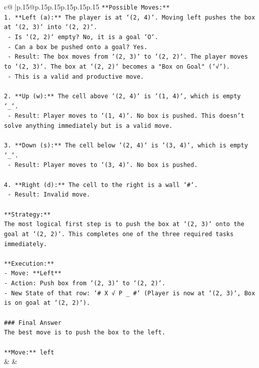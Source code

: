 \documentclass{article}
\begin{document}
{\begin{supertabular}{c@{$\;$}|p{.15\linewidth}@{}p{.15\linewidth}p{.15\linewidth}p{.15\linewidth}p{.15\linewidth}p{.15\linewidth}}
{{{\texttt{**Possible Moves:**} \\
\texttt{1. **Left (a):** The player is at `(2, 4)`. Moving left pushes the box at `(2, 3)` into `(2, 2)`.} \\
\texttt{   {-} Is `(2, 2)` empty? No, it is a goal `O`.} \\
\texttt{   {-} Can a box be pushed onto a goal? Yes.} \\
\texttt{   {-} Result: The box moves from `(2, 3)` to `(2, 2)`. The player moves to `(2, 3)`. The box at `(2, 2)` becomes a "Box on Goal" (`√`).} \\
\texttt{   {-} This is a valid and productive move.} \\
\\ 
\texttt{2. **Up (w):** The cell above `(2, 4)` is `(1, 4)`, which is empty `\_`.} \\
\texttt{   {-} Result: Player moves to `(1, 4)`. No box is pushed. This doesn't solve anything immediately but is a valid move.} \\
\\ 
\texttt{3. **Down (s):** The cell below `(2, 4)` is `(3, 4)`, which is empty `\_`.} \\
\texttt{   {-} Result: Player moves to `(3, 4)`. No box is pushed.} \\
\\ 
\texttt{4. **Right (d):** The cell to the right is a wall `\#`.} \\
\texttt{   {-} Result: Invalid move.} \\
\\ 
\texttt{**Strategy:**} \\
\texttt{The most logical first step is to push the box at `(2, 3)` onto the goal at `(2, 2)`. This completes one of the three required tasks immediately.} \\
\\ 
\texttt{**Execution:**} \\
\texttt{{-} Move: **Left**} \\
\texttt{{-} Action: Push box from `(2, 3)` to `(2, 2)`.} \\
\texttt{{-} New State of that row: `\# X √ P \_ \#` (Player is now at `(2, 3)`, Box is on goal at `(2, 2)`).} \\
\\ 
\texttt{\#\#\# Final Answer} \\
\texttt{The best move is to push the box to the left.} \\
\\ 
\texttt{**Move:** left} \\
            }
        }
    }
    & & \\ \\


\end{supertabular}}
\end{document}
